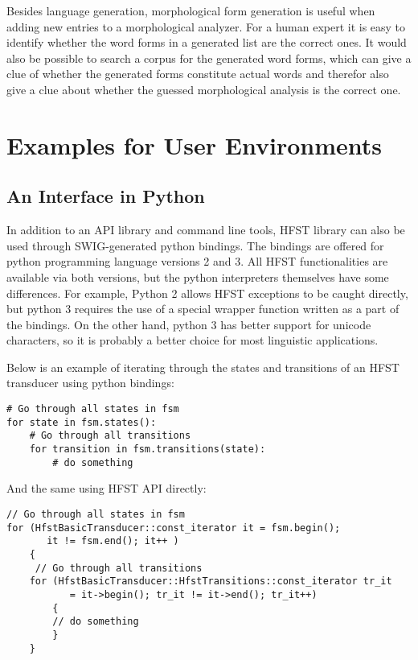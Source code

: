 \documentclass{llncs}
\begin{document}
Besides language generation, morphological form generation is useful
when adding new entries to a morphological analyzer. For a human
expert it is easy to identify whether the word forms in a generated
list are the correct ones. It would also be possible to search a
corpus for the generated word forms, which can give a clue of whether
the generated forms constitute actual words and therefor also give a
clue about whether the guessed morphological analysis is the correct
one.

\section{Examples for User Environments}

\subsection{An Interface in Python}

In addition to an API library and command line tools, HFST library can
also be used through SWIG-generated python bindings. The bindings are
offered for python programming language versions 2 and 3. All HFST
functionalities are available via both versions, but the python
interpreters themselves have some differences. For example, Python 2
allows HFST exceptions to be caught directly, but python 3 requires
the use of a special wrapper function written as a part of the
bindings. On the other hand, python 3 has better support for unicode
characters, so it is probably a better choice for most linguistic
applications.

Below is an example of iterating through the states and transitions of
an HFST transducer using python bindings:

\begin{verbatim}
# Go through all states in fsm       
for state in fsm.states():
    # Go through all transitions                                               
    for transition in fsm.transitions(state):
        # do something
\end{verbatim}

And the same using HFST API directly:

\begin{verbatim}
// Go through all states in fsm
for (HfstBasicTransducer::const_iterator it = fsm.begin();
       it != fsm.end(); it++ )      
    {      
     // Go through all transitions    
    for (HfstBasicTransducer::HfstTransitions::const_iterator tr_it  
           = it->begin(); tr_it != it->end(); tr_it++) 
        {
        // do something
        }
    }
\end{verbatim}
\end{document}
